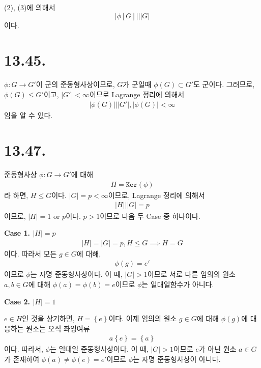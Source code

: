 \documentclass{article}
\begin{document}
(2), (3)에 의해서 
$$\left|\phi[G] \right| \bigg| \left|G\right|$$이다.

\section{13.45.}
$\phi : G \rightarrow G'$이 군의 준동형사상이므로, $G$가 군일때 $\phi(G) \subset G'$도 군이다. 그러므로, $\phi(G) \le G'$이고, $\left|G'\right| < \infty$이므로 Lagrange 정리에 의해서 
\begin{align*}
\left|\phi(G) \right| \bigg| \left|   G'\right|, \left|\phi(G) \right| < \infty
\end{align*}임을 알 수 있다.

\section{13.47.}
준동형사상 $\phi : G \rightarrow G'$에 대해
\begin{align*}
H = \texttt{Ker}(\phi)
\end{align*}라 하면, $H \le G$이다. $\left| G \right| = p < \infty$이므로, Lagrange 정리에 의해서
\begin{align*}
\left|H\right| \bigg| \left|G\right| = p \tag{$p$는 소수}
\end{align*}이므로, $\left|H\right| = 1 \text{ or } p$이다. $p>1$이므로 다음 두 Case 중 하나이다.

\textbf{Case 1. $\left|H\right| = p$}
\begin{align*}
\left|H\right| = \left|G\right| = p, H \le G \implies H = G
\end{align*}이다. 따라서 모든 $g \in G$에 대해,
\begin{align*}
\phi(g) = e'
\end{align*}이므로 $\phi$는 자명 준동형사상이다. 이 때, $\left|G\right| > 1$이므로 서로 다른 임의의 원소 $a, b \in G$에 대해 $\phi(a) = \phi(b) = e$이므로 $\phi$는 일대일함수가 아니다.

\textbf{Case 2. $\left|H\right| = 1$}

$e \in H$인 것을 상기하면, $H = \left\{e\right\}$이다. 이제 임의의 원소 $g \in G$에 대해 $\phi(g)$에 대응하는 원소는 오직 좌잉여류
\begin{align*}
a\left\{e\right\} = \left\{a\right\}
\end{align*}이다. 따라서, $\phi$는 일대일 준동형사상이다. 이 때, $\left|G\right| > 1$이므로 $e$가 아닌 원소 $a \in G$가 존재하여 $\phi(a) \neq \phi(e) = e'$이므로 $\phi$는 자명 준동형사상이 아니다.
\end{document}
